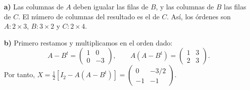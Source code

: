 \textbf{a)} Las columnas de $A$ deben igualar las filas de $B$, y las columnas de $B$ las filas de $C$. El número de columnas del resultado es el de $C$. Así, los órdenes son $A:2\times3$, $B:3\times2$ y $C:2\times4$.

\textbf{b)} Primero restamos y multiplicamos en el orden dado:
\[
A-B^t=\begin{pmatrix}1&0\\0&-3\end{pmatrix},
\qquad A(A-B^t)=\begin{pmatrix}1&3\\2&3\end{pmatrix}.
\]
Por tanto, $X=\tfrac12[I_2-A(A-B^t)]=\boxed{\begin{pmatrix}0&-3/2\\-1&-1\end{pmatrix}}$.
